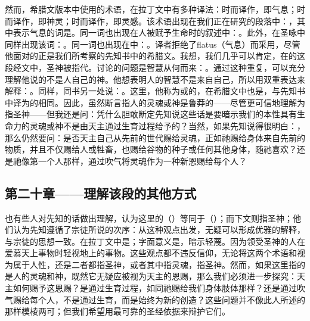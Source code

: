然而，希腊文版本中使用的术语，在拉丁文中有多种译法：时而译作，即气息；时而译作，即神灵；时而译作，即灵感。该术语出现在我们正在研究的段落中：，其中表示气息的词是。同一词也出现在人被赋予生命时的叙述中：。此外，在圣咏中同样出现该词：。同一词也出现在中：。译者拒绝了flatus（气息）而采用，尽管他面对的正是我们所考察的先知书中的希腊文。我想，我们几乎可以肯定，在的这段经文中，圣神被指代。讨论的问题是智慧从何而来：。通过这种重复，可以充分理解他说的不是人自己的神。他想表明人的智慧不是来自自己，所以用双重表达来解释：。同样，同书另一处说：。这里，他称为或的，在希腊文中也是，与先知书中译为的相同。因此，虽然断言指人的灵魂或神是鲁莽的——尽管更可信地理解为指圣神——但我还是问：凭什么胆敢断定先知说这些话是要暗示我们的本性具有生命力的灵魂或神不是由天主通过生育过程给予的？当然，如果先知说得很明白：，那么仍然要问：是否天主自己从先前的世代赐给灵魂，正如祂赐给身体来自先前的物质，并且不仅赐给人或牲畜，也赐给谷物的种子或任何其他身体，随祂喜欢？还是祂像第一个人那样，通过吹气将灵魂作为一种新恩赐给每个人？\par


\subsection{第二十章——理解该段的其他方式}

也有些人对先知的话做出理解，认为这里的（）等同于（）；而下文则指圣神；他们认为先知遵循了宗徒所说的次序：从这种观点出发，无疑可以形成优雅的解释，与宗徒的思想一致。在拉丁文中是；字面意义是，暗示轻蔑。因为领受圣神的人在爱慕天上事物时轻视地上的事物。这些观点都不违反信仰，无论将这两个术语和视为属于人性，还是二者都指圣神，或者其中指灵魂，指圣神。然而，如果这里指的是人的灵魂和神，既然它无疑应被视为天主的恩赐，那么我们必须进一步探究：天主如何赐予这恩赐？是通过生育过程，如同祂赐给我们身体肢体那样？还是通过吹气赐给每个人，不是通过生育，而是始终为新的创造？这些问题并不像此人所述的那样模棱两可；但我们希望用最可靠的圣经依据来辩护它们。\par


